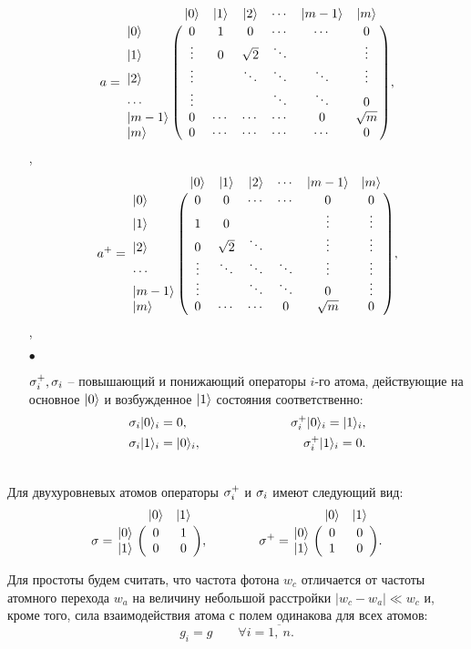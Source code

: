 \begin{itemize}
{		\begin{equation}
			a =
			\bordermatrix{
				& |0\rangle & |1\rangle & |2\rangle & \cdots & |m-1\rangle & |m\rangle \cr
				|0\rangle & 0 & 1 & 0 & \cdots & \cdots & 0 \cr
				|1\rangle & \vdots & 0 & \sqrt{2} & \ddots &  & \vdots \cr
				|2\rangle & \vdots &  & \ddots & \ddots & \ddots & \vdots \cr
				\cdots & \vdots &  &  & \ddots & \ddots & 0 \cr
				|m-1\rangle & 0 & \cdots & \cdots & \cdots & 0 & \sqrt{m} \cr
				|m\rangle & 0 & \cdots & \cdots & \cdots & \cdots & 0\cr
			},
		\end{equation}
	},\\[12pt]
	\begin{equation}
		a^{+} =
		\bordermatrix{
			& |0\rangle & |1\rangle & |2\rangle & \cdots & |m-1\rangle & |m\rangle \cr
			|0\rangle & 0 & 0 & \cdots & \cdots & 0 & 0 \cr
			|1\rangle & 1 & 0 &  &  & \vdots & \vdots \cr
			|2\rangle & 0 & \sqrt{2} & \ddots & & \vdots & \vdots \cr
			\cdots & \vdots & \ddots & \ddots & \ddots & \vdots & \vdots \cr
			|m-1\rangle & \vdots &  & \ddots & \ddots & 0 & \vdots \cr
			|m\rangle & 0 & \cdots & \cdots & 0 & \sqrt{m} & 0\cr
		},
	\end{equation}
	,\\
	\item[$\bullet$]{$\sigma^{+}_{i}, \sigma_{i}$ -- повышающий и понижающий операторы $i$-го атома, действующие на основное $|0\rangle$ и возбужденное $|1\rangle$ состояния соответственно:\\
		\begin{equation}
			\begin{split}
				\s_{i}|0\ra_{i} = 0,\qquad\qquad\qquad\qquad\s^{+}_{i}|0\ra_{i} = |1\ra_{i},\\
				\noindent\s_{i}|1\ra_{i} = |0\ra_{i},\qquad\qquad\qquad\qquad\s^{+}_{i}|1\ra_{i} = 0.
			\end{split}
		\end{equation}
		
	}
\end{itemize}
\
\\[12pt]
Для двухуровневых атомов операторы $\sigma^{+}_{i}$ и $\sigma_{i}$ имеют следующий вид:
\begin{equation}
	\sigma = \bordermatrix{
		& |0\rangle &
		|1\rangle \cr 
		|0\rangle & 0 & 1 \cr 
		|1\rangle & 0 & 0 \cr },
	\qquad\qquad
	\sigma^{+} = \bordermatrix{ 
		& |0\rangle & |1\rangle \cr
		|0\rangle &
		0 & 0 \cr
		|1\rangle & 1 & 0 \cr 
	}.
\end{equation}

Для простоты будем считать, что частота фотона $w_{c}$ отличается от частоты атомного
перехода $w_{a}$ на величину небольшой расстройки $|w_{c} - w_{a}| \ll w_{c}$ и, кроме того, сила взаимодействия атома с полем одинакова для всех атомов:
\[
g_{i} = g\qquad\forall i = \overline{1,~n}.
\]

